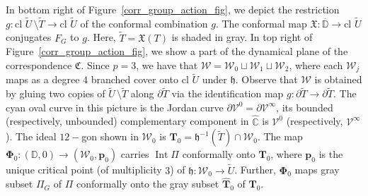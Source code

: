 \documentclass[11pt,a4paper, oneside]{amsart}
\theoremstyle{definition}
\theoremstyle{remark}
\DeclareMathOperator{\Int}{Int}
\numberwithin{equation}{section}
\def\D{{\mathbb{D}}}
\def\cV{\mathcal {V}}
\def\cW{\mathcal {W}}
\newcommand{\C}{\mathbb{C}}
\newcommand{\sm}{\setminus}
\renewcommand{\tilde}{\widetilde}
\newcommand{\clo}{{\text{cl}}\,\,}
\begin{document}
In bottom right of Figure~\ref{corr_group_action_fig}, we depict the restriction $g:\clo\tilde U\,\sm\tilde T\to\clo\tilde U$ of the conformal combination $g$. The conformal map $\mathfrak{X}:\overline{\D}\to\clo\tilde U$ conjugates $F_G$ to $g$. Here, $\tilde T=\mathfrak{X}(T)$ is shaded in gray. In top right of Figure~\ref{corr_group_action_fig}, we show a part of the dynamical plane of the correspondence $\mathfrak{C}$. Since $p=3$, we have that $\pmb{\cW}=\pmb{\cW}_0\sqcup\pmb{\cW}_1\sqcup\pmb{\cW}_2$, where each $\pmb{\cW}_j$ maps as a degree $4$ branched cover onto $\clo\tilde U$ under $\mathfrak{h}$. Observe that $\pmb{\cW}$ is obtained by gluing two copies of $\tilde U\,\sm\tilde T$ along $\partial\tilde T$ via the identification map $g\colon\partial\tilde T\to\partial\tilde T$. The cyan oval curve in this picture is the Jordan curve $\partial\cV^0=\partial\cV^\infty$, its bounded (respectively, unbounded) complementary component in $\widehat{\C}$ is $\cV^0$ (respectively, $\cV^\infty$). The ideal $12-$gon shown in $\pmb{\cW}_0$ is $\pmb{T}_0=\mathfrak{h}^{-1}(\tilde T)\cap\pmb{\cW}_0$. The map $\pmb{\Phi}_0\colon(\D,0)\to(\pmb{\cW}_0,\pmb{p}_0)$ carries $\Int{\Pi}$ conformally onto $\pmb{T}_0$, where $\pmb{p}_0$ is the unique critical point (of multiplicity $3$) of $\mathfrak{h}\colon\pmb{\cW}_0\to\tilde U$. Further, $\pmb{\Phi}_0$ maps gray subset $\Pi_G$ of $\Pi$ conformally onto the gray subset $\widehat{\pmb{T}}_0$ of $\pmb{T}_0$.
\end{document}
